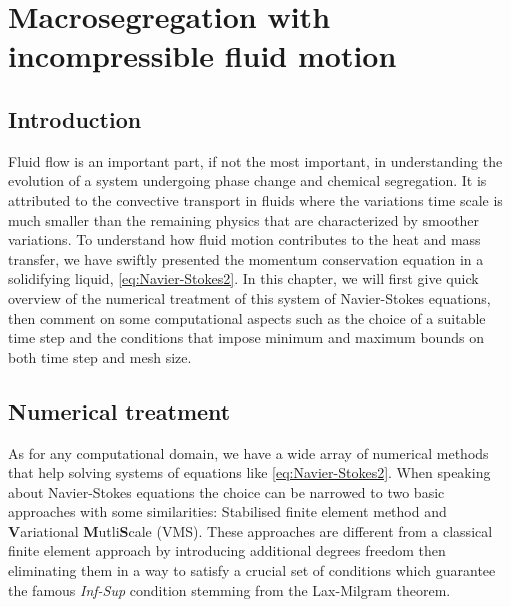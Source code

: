 \chapter{Macrosegregation with incompressible fluid motion}
\begin{nolinkcolors} 
\minitoc
\end{nolinkcolors}
\newpage
%
%
\section{Introduction}
Fluid flow is an important part, if not the most important, in understanding the evolution of a system
undergoing phase change and chemical segregation. It is attributed to the convective transport in fluids
where the variations time scale is much smaller than the remaining physics that are characterized by
smoother variations. To understand how fluid motion contributes to the heat and mass transfer, we have 
swiftly presented the momentum conservation equation in a solidifying liquid, \cref{eq:Navier-Stokes2}.
In this chapter, we will first give quick overview of the numerical treatment of this system of 
Navier-Stokes equations, then comment on some computational aspects such as the choice of a suitable time step and
the conditions that impose minimum and maximum bounds on both time step and mesh size.
%
%
\section{Numerical treatment}
As for any computational domain, we have a wide array of numerical methods that help solving systems of equations 
like \cref{eq:Navier-Stokes2}. When speaking about Navier-Stokes equations the choice can be narrowed to two basic
approaches with some similarities: Stabilised finite element method and \textbf{V}ariational \textbf{M}utli\textbf{S}cale (VMS).
These approaches are different from a classical finite element approach by introducing additional degrees freedom then 
eliminating them in a way to satisfy a crucial set of conditions which guarantee the famous \emph{Inf-Sup} condition stemming
from the Lax-Milgram theorem.
%
